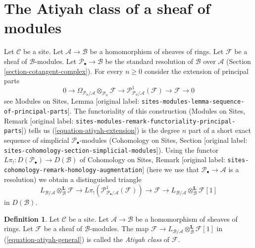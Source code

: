 \documentclass[10pt,a4paper]{article}
\theoremstyle{plain}
\theoremstyle{definition}
\newtheorem{definition}[subsection]{Definition}
\theoremstyle{remark}
\numberwithin{equation}{subsection}
\begin{document}
\section{The Atiyah class of a sheaf of modules}
\label{section-atiyah-general}

\noindent
Let $\mathcal{C}$ be a site. Let $\mathcal{A} \to \mathcal{B}$ be a
homomorphism of sheaves of rings. Let $\mathcal{F}$ be a
sheaf of $\mathcal{B}$-modules. Let $\mathcal{P}_\bullet \to \mathcal{B}$
be the standard resolution of $\mathcal{B}$ over $\mathcal{A}$
(Section \ref{section-cotangent-complex}).
For every $n \geq 0$ consider the extension of principal parts
\begin{equation}
\label{equation-atiyah-extension}
0 \to
\Omega_{\mathcal{P}_n/\mathcal{A}} \otimes_{\mathcal{P}_n} \mathcal{F} \to
\mathcal{P}^1_{\mathcal{P}_n/\mathcal{A}}(\mathcal{F}) \to
\mathcal{F} \to 0
\end{equation}
see
Modules on Sites, Lemma \textnormal{[original label: \nolinkurl{sites-modules-lemma-sequence-of-principal-parts}]}.
The functoriality of this construction
(Modules on Sites, Remark
\textnormal{[original label: \nolinkurl{sites-modules-remark-functoriality-principal-parts}]})
tells us (\ref{equation-atiyah-extension}) is the degree $n$ part of
a short exact sequence of simplicial $\mathcal{P}_\bullet$-modules
(Cohomology on Sites, Section
\textnormal{[original label: \nolinkurl{sites-cohomology-section-simplicial-modules}]}).
Using the functor $L\pi_! : D(\mathcal{P}_\bullet) \to D(\mathcal{B})$
of Cohomology on Sites, Remark
\textnormal{[original label: \nolinkurl{sites-cohomology-remark-homology-augmentation}]}
(here we use that $\mathcal{P}_\bullet \to \mathcal{A}$ is a resolution)
we obtain a distinguished triangle
\begin{equation}
\label{equation-atiyah-general}
L_{\mathcal{B}/\mathcal{A}} \otimes_\mathcal{B}^\mathbf{L} \mathcal{F} \to
L\pi_!\left(\mathcal{P}^1_{\mathcal{P}_\bullet/\mathcal{A}}(\mathcal{F})\right)
\to \mathcal{F} \to
L_{\mathcal{B}/\mathcal{A}} \otimes_\mathcal{B}^\mathbf{L} \mathcal{F} [1]
\end{equation}
in $D(\mathcal{B})$.

\begin{definition}
\label{definition-atiyah-class-general}
Let $\mathcal{C}$ be a site.
Let $\mathcal{A} \to \mathcal{B}$ be a homomorphism of sheaves of rings.
Let $\mathcal{F}$ be a sheaf of $\mathcal{B}$-modules.
The map $\mathcal{F} \to
L_{\mathcal{B}/\mathcal{A}} \otimes_\mathcal{B}^\mathbf{L} \mathcal{F}[1]$
in (\ref{equation-atiyah-general}) is called the {\it Atiyah class} of
$\mathcal{F}$.
\end{definition}
\end{document}

